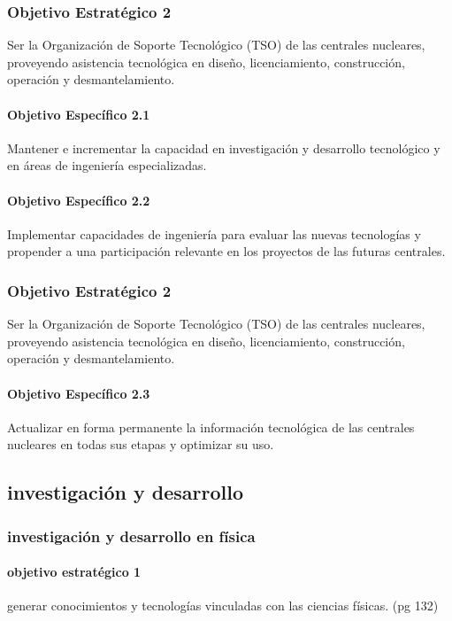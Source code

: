 \subsubsection{Objetivo Estratégico 2}

Ser la Organización de Soporte Tecnológico (TSO)
de las centrales nucleares, proveyendo asistencia tecnológica en diseño,
licenciamiento, construcción, operación y desmantelamiento.

\paragraph{Objetivo Específico 2.1}
Mantener e incrementar la capacidad en investigación y
desarrollo tecnológico y en áreas de ingeniería especializadas.

\paragraph{Objetivo Específico 2.2}

Implementar capacidades de ingeniería para evaluar las nuevas
tecnologías y propender a una participación relevante en los proyectos de las futuras
centrales.

\subsubsection{Objetivo Estratégico 2}

Ser la Organización de Soporte Tecnológico (TSO)
de las centrales nucleares, proveyendo asistencia tecnológica en diseño,
licenciamiento, construcción, operación y desmantelamiento.

\paragraph{Objetivo Específico 2.3}

Actualizar en forma permanente la información tecnológica de
las centrales nucleares en todas sus etapas y optimizar su uso.

\subsection{investigación y desarrollo}
\subsubsection{investigación y desarrollo en física}
\paragraph{objetivo estratégico 1}
generar conocimientos y tecnologías vinculadas con las ciencias físicas. (pg 132)

